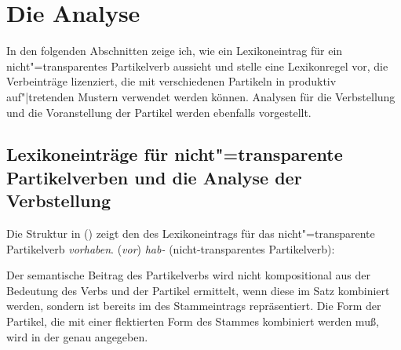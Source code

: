 \section{Die Analyse}
\label{sec-pv-anal}

In den folgenden Abschnitten zeige ich, wie ein Lexikoneintrag
für ein nicht"=transparentes Partikelverb aussieht und stelle
eine Lexikonregel vor, die Verbeinträge lizenziert, die mit verschiedenen
Partikeln in produktiv auf"|tretenden Mustern verwendet werden können.
Analysen für die Verbstellung und die Voranstellung der Partikel
werden ebenfalls vorgestellt.

\subsection{Lexikoneinträge für nicht"=transparente Partikelverben und die Analyse der Verbstellung}
\label{le-nontr-part-verb}

Die Struktur in () zeigt den \locw des Lexikoneintrags für das
nicht"=transparente Partikelverb \emph{vorhaben}.
%
\eas
(\emph{vor}) \emph{hab-} (nicht-transparentes Partikelverb):\label{le-vorhaben}
\\
\zs

\noindent
Der semantische Beitrag des Partikelverbs wird nicht kompositional aus der Bedeutung
des Verbs und der Partikel ermittelt, wenn diese im Satz kombiniert werden, sondern
ist bereits im \contw des Stammeintrags repräsentiert. Die Form der Partikel,
die mit einer flektierten Form des Stammes kombiniert werden muß, wird in der
\subcatl genau angegeben.


